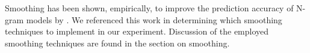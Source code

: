 \documentclass[ai15_group61_report.tex]{subfiles}
\begin{document}

Smoothing has been shown, empirically, to improve the prediction accuracy of N-gram models by \cite{chen-smoothing}. We referenced this work in determining which smoothing techniques to implement in our experiment. Discussion of the employed smoothing techniques are found in the section on smoothing.

\end{document}
